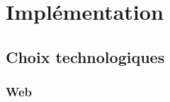 \documentclass{EPL-master-thesis-covers-FR}
\begin{document}
	\chapter{Implémentation}



		\section{Choix technologiques}
			\label{sec:choix_tech}




			\subsection*{Web}
\end{document}
